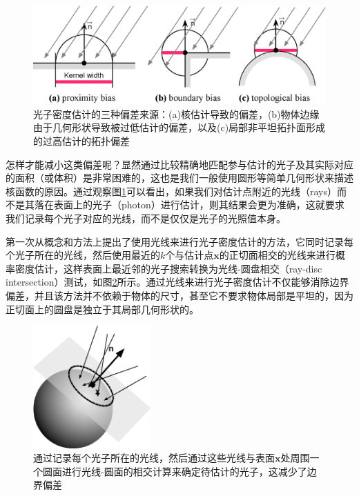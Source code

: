 \begin{figure}
	\includegraphics[width=\textwidth]{figures/pm/biases}
	\caption{光子密度估计的三种偏差来源：(a)核估计导致的偏差，(b)物体边缘由于几何形状导致被过低估计的偏差，以及(c)局部非平坦拓扑面形成的过高估计的拓扑偏差}
	\label{f:pm-biases}
\end{figure}

怎样才能减小这类偏差呢？显然通过比较精确地匹配参与估计的光子及其实际对应的面积（或体积）是非常困难的，这也是我们一般使用圆形等简单几何形状来描述核函数的原因。通过观察图\ref{f:pm-biases}可以看出，如果我们对估计点附近的光线（rays）而不是其落在表面上的光子（photon）进行估计，则其结果会更为准确，这就要求我们记录每个光子对应的光线，而不是仅仅是光子的光照值本身。

\cite{a:AParticlePathbasedMethodforMonteCarloDensityEstimation}第一次从概念和方法上提出了使用光线来进行光子密度估计的方法，它同时记录每个光子所在的光线，然后使用最近的$k$个与估计点$\mathbf{x}$的正切面相交的光线来进行概率密度估计，这样表面上最近邻的光子搜索转换为光线-圆盘相交（ray-disc intersection）测试，如图\ref{f:pm-ray-disc}所示。通过光线来进行光子密度估计不仅能够消除边界偏差，并且该方法并不依赖于物体的尺寸，甚至它不要求物体局部是平坦的，因为正切面上的圆盘是独立于其局部几何形状的。

\begin{figure}
	\sidecaption
	\includegraphics[width=0.4\textwidth]{figures/pm/ray-disc}
	\caption{\cite{a:AParticlePathbasedMethodforMonteCarloDensityEstimation}通过记录每个光子所在的光线，然后通过这些光线与表面$\mathbf{x}$处周围一个圆面进行光线-圆面的相交计算来确定待估计的光子，这减少了边界偏差}
	\label{f:pm-ray-disc}
\end{figure}

